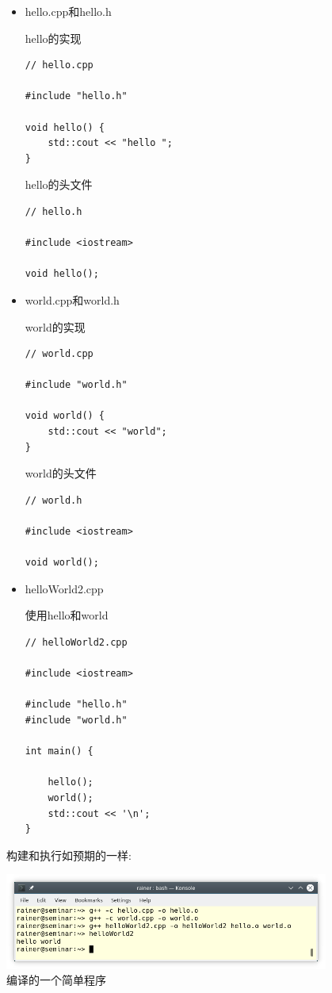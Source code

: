 \begin{itemize}
\item 
hello.cpp和hello.h

\noindent
hello的实现
\begin{lstlisting}[style=styleCXX]
// hello.cpp

#include "hello.h"

void hello() {
	std::cout << "hello ";
}
\end{lstlisting}

\noindent
hello的头文件
\begin{lstlisting}[style=styleCXX]
// hello.h

#include <iostream>

void hello();
\end{lstlisting}

\item 
world.cpp和world.h

\noindent
world的实现
\begin{lstlisting}[style=styleCXX]
// world.cpp

#include "world.h"

void world() {
	std::cout << "world";
}
\end{lstlisting}

\noindent
world的头文件
\begin{lstlisting}[style=styleCXX]
// world.h

#include <iostream>

void world();
\end{lstlisting}

\item 
helloWorld2.cpp

\noindent
使用hello和world
\begin{lstlisting}[style=styleCXX]
// helloWorld2.cpp

#include <iostream>

#include "hello.h"
#include "world.h"

int main() {
	
	hello();
	world();
	std::cout << '\n';
}
\end{lstlisting}


\end{itemize}

构建和执行如预期的一样:

\begin{center}
\includegraphics[width=0.8\textwidth]{content/3/chapter4/images/14.png}\\
编译的一个简单程序
\end{center}

